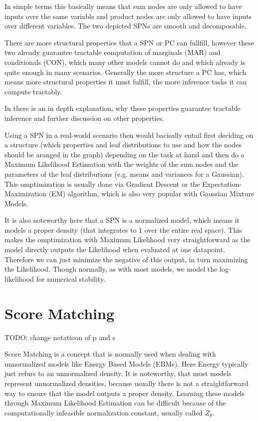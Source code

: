 In simple terms this basically means that sum nodes are only allowed to have inputs over the same variable and product nodes are
only allowed to have inputs over different variables. The two depicted SPNs are smooth and decomposable.

There are more structural properties that a SPN or PC can fullfill, however these two already guarantee tractable computation of 
marginals (MAR) and conditionals (CON)\cite{pc_intro}, which many other models cannot do and which already is quite enough in many scenarios. 
Generally the more structure a PC has, which means more structural properties it must fulfill, the more inference tasks it can compute 
tractably. 

In \cite{pc_intro} there is an in depth explanation, why these properties guarantee tractable inference 
and further discussion on other properties.

Using a SPN in a real-world scenario then would bacisally entail first deciding on a structure (which properties and leaf 
distributions to use and how the nodes should be aranged in the graph) depending on the task at hand and then do a Maximum Likelihood 
Estimation with the weights of the sum nodes and the parameters of the leaf distributions (e.g. means and variances for a Gaussian). 
This omptimization is usually done via Gradient Descent or the Expectation-Maximization (EM) algorithm, 
which is also very popular with Gaussian Mixture Models. 

It is also noteworthy here that a SPN is a normalized model, which means it models a proper density (that integrates to $1$ over the entire real space). 
This makes the omptimization with Maximum Likelihood very straightforward as the model directly outputs the Likelihood when evaluated at one datapoint.
Therefore we can just minimize the negative of this output, in turn maximizing the Likelihood.
Though normally, as with most models, we model the log-likelihood for numerical stability.


\section{Score Matching}
\label{sec:sm}

TODO: change notatioon of p and s

Score Matching \cite{sm} is a concept that is normally used when dealing with unnormalized models like Energy Based Models (EBMs). Here 
Energy typically just refurs to an unnormalized density. It is noteworthy, that most models represent unnormalized densities, 
because usually there is not a straightforward way to ensure that the model outputs a proper density.
Learning these models through Maximum Likelihood Estimation can be difficult because of the computationally infeasible normalization 
constant, usually called $Z_\theta$.


